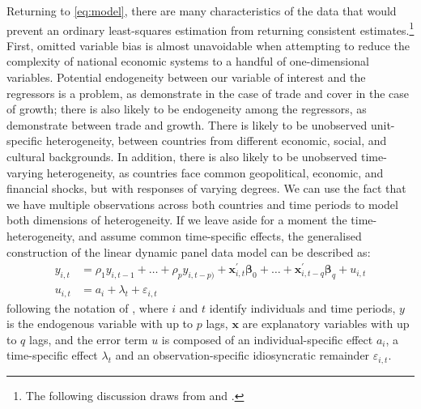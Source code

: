 \documentclass[12pt,a4paper]{article}
\begin{document}
Returning to \cref{eq:model}, there are many characteristics of the data that would prevent an ordinary least-squares estimation from returning consistent estimates.\footnote{
The following discussion draws from \cite{fritschGMMEstimationLinear2019} and \cite{rashidDynamicPanelData2018}.
}
First, omitted variable bias is almost unavoidable when attempting to reduce the complexity of national economic systems to a handful of one-dimensional variables.
Potential endogeneity between our variable of interest and the regressors is a problem, as \cite{shahbazDynamicLinksEnergy2013} demonstrate in the case of trade and \cite{nayanRevisitingEnergyConsumption2013} cover in the case of growth; there is also likely to be endogeneity among the regressors, as \cite{rodriguezTradePolicyEconomic2001} demonstrate between trade and growth.
There is likely to be unobserved unit-specific heterogeneity, between countries from different economic, social, and cultural backgrounds.
In addition, there is also likely to be unobserved time-varying heterogeneity, as countries face common geopolitical, economic, and financial shocks, but with responses of varying degrees.
We can use the fact that we have multiple observations across both countries and time periods to model both dimensions of heterogeneity.
If we leave aside for a moment the time-heterogeneity, and assume common time-specific effects, the generalised construction of the linear dynamic panel data model can be described as:
\begin{align}
y_{i,t} &= \rho_1 y_{i,t-1} + \dots + \rho_p y_{i,t-p)} 
	+ \boldsymbol{x}^\prime_{i,t} \boldsymbol{\beta}_0 + \dots + \boldsymbol{x}^\prime_{i,t-q} \boldsymbol{\beta}_q 
	+ u_{i,t} \label{eq:panel} \\
u_{i,t} &= a_i + \lambda_t + \varepsilon_{i,t}
\end{align}
following the notation of \cite{fritschGMMEstimationLinear2019}, where $i$ and $t$ identify individuals and time periods, $y$ is the endogenous variable with up to $p$ lags, $\boldsymbol{x}$ are explanatory variables with up to $q$ lags, and the error term $u$ is composed of an individual-specific effect $a_i$, a time-specific effect $\lambda_t$ and an observation-specific  idiosyncratic remainder $\varepsilon_{i,t}$.
\end{document}
